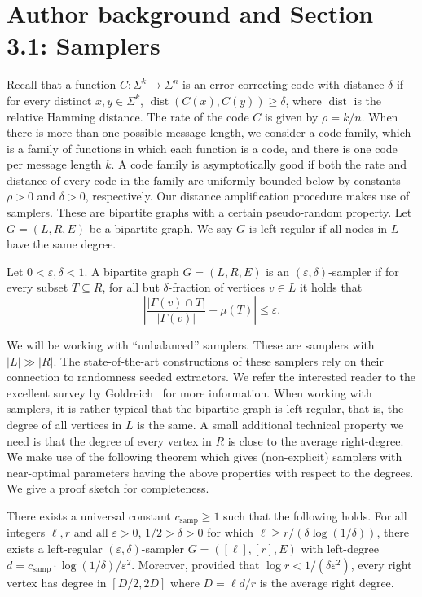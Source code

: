 \section*{Author background and Section 3.1: Samplers}
Recall that a function $C:\Sigma^k\to\Sigma^n$ is an error-correcting code with distance $\delta$ if for every distinct $x,y\in\Sigma^k$, $\operatorname{dist}(C(x),C(y))\geq\delta$, where $\operatorname{dist}$ is the relative Hamming distance. The rate of the code $C$ is given by $\rho=k/n$. When there is more than one possible message length, we consider a code family, which is a family of functions in which each function is a code, and there is one code per message length $k$. A code family is asymptotically good if both the rate and distance of every code in the family are uniformly bounded below by constants $\rho>0$ and $\delta>0$, respectively.
Our distance amplification procedure makes use of samplers. These are bipartite graphs with a certain pseudo-random property. Let $G=(L,R,E)$ be a bipartite graph. We say $G$ is left-regular if all nodes in $L$ have the same degree.
\setcounter{nttheorem}{13}
\begin{ntdefinition}
Let $0<\varepsilon,\delta<1$. A bipartite graph $G=(L,R,E)$ is an $(\varepsilon,\delta)$-sampler if for every subset $T\subseteq R$, for all but $\delta$-fraction of vertices $v\in L$ it holds that
\[\left|\frac{|\Gamma(v)\cap T|}{|\Gamma(v)|}-\mu(T)\right|\leq\varepsilon.\]
\end{ntdefinition}
We will be working with ``unbalanced'' samplers. These are samplers with $|L|\gg|R|$. The state-of-the-art constructions of these samplers rely on their connection to randomness seeded extractors. We refer the interested reader to the excellent survey by Goldreich~\cite{ref17} for more information. When working with samplers, it is rather typical that the bipartite graph is left-regular, that is, the degree of all vertices in $L$ is the same. A small additional technical property we need is that the degree of every vertex in $R$ is close to the average right-degree. We make use of the following theorem which gives (non-explicit) samplers with near-optimal parameters having the above properties with respect to the degrees. We give a proof sketch for completeness.
\begin{nttheorem}
There exists a universal constant $c_{\mathrm{samp}}\geq1$ such that the following holds. For all integers $\ell,r$ and all $\varepsilon>0$, $1/2>\delta>0$ for which $\ell\geq r/(\delta\log(1/\delta))$, there exists a left-regular $(\varepsilon,\delta)$-sampler $G=([\ell],[r],E)$ with left-degree $d=c_{\mathrm{samp}}\cdot\log(1/\delta)/\varepsilon^2$. Moreover, provided that $\log r<1/(\delta\varepsilon^2)$, every right vertex has degree in $[D/2,2D]$ where $D=\ell d/r$ is the average right degree.
\end{nttheorem}
